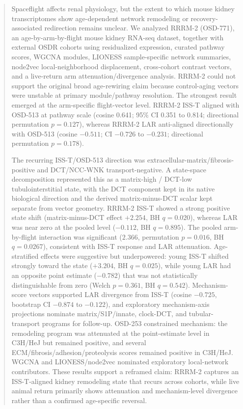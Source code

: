 \documentclass[11pt]{article}
\begin{document}
\begin{abstract}
\noindent
Spaceflight affects renal physiology, but the extent to which mouse kidney transcriptomes show age-dependent network remodeling or recovery-associated redirection remains unclear. We analyzed RRRM-2 (OSD-771), an age-by-arm-by-flight mouse kidney RNA-seq dataset, together with external OSDR cohorts using residualized expression, curated pathway scores, WGCNA modules, LIONESS sample-specific network summaries, node2vec local-neighborhood displacement, cross-cohort contrast vectors, and a live-return arm attenuation/divergence analysis. RRRM-2 could not support the original broad age-rewiring claim because control-aging vectors were unstable at primary module/pathway resolution. The strongest result emerged at the arm-specific flight-vector level. RRRM-2 ISS-T aligned with OSD-513 at pathway scale (cosine 0.641; 95\% CI 0.351 to 0.814; directional permutation $p=0.127$), whereas RRRM-2 LAR anti-aligned directionally with OSD-513 (cosine $-0.511$; CI $-0.726$ to $-0.231$; directional permutation $p=0.178$).

The recurring ISS-T/OSD-513 direction was extracellular-matrix/fibrosis-positive and DCT/NCC-WNK transport-negative. A state-space decomposition represented this as a matrix-high / DCT-low tubulointerstitial state, with the DCT component kept in its native biological direction and the derived matrix-minus-DCT scalar kept separate from vector geometry. RRRM-2 ISS-T showed a strong positive state shift (matrix-minus-DCT effect $+2.254$, BH $q=0.020$), whereas LAR was near zero at the pooled level ($-0.112$, BH $q=0.895$). The pooled arm-by-flight interaction was significant ($2.366$, permutation $p=0.016$, BH $q=0.0267$), consistent with ISS-T response and LAR attenuation. Age-stratified effects were suggestive but underpowered: young ISS-T shifted strongly toward the state ($+3.204$, BH $q=0.025$), while young LAR had an opposite point estimate ($-0.782$) that was not statistically distinguishable from zero (Welch $p=0.361$, BH $q=0.542$). Mechanism-score vectors supported LAR divergence from ISS-T (cosine $-0.725$, bootstrap CI $-0.874$ to $-0.122$), and exploratory mechanism-axis projections nominate matrix/S1P/innate, clock-DCT, and tubular-transport programs for follow-up. OSD-253 constrained mechanism: the remodeling program was attenuated at the point-estimate level in C3H/HeJ but remained positive, and several ECM/fibrosis/adhesion/proteolysis scores remained positive in C3H/HeJ. WGCNA and LIONESS/node2vec nominated exploratory local-network contributors. These results support a reframed claim: RRRM-2 captures an ISS-T-aligned kidney remodeling state that recurs across cohorts, while live animal return primarily shows attenuation and mechanism-level divergence rather than a confirmed age-specific reversal.
\end{abstract}
\end{document}
